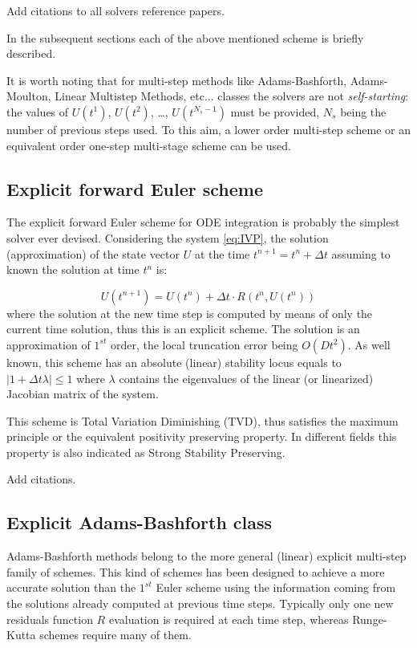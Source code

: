 {\color{red} Add citations to all solvers reference papers.}

In the subsequent sections each of the above mentioned scheme is briefly described.

It is worth noting that for multi-step methods like Adams-Bashforth, Adams-Moulton, Linear Multistep Methods, etc... classes the solvers are not \emph{self-starting}: the values of $U\left(t^{1}\right)$, $U\left(t^{2}\right)$, \dots, $U\left(t^{N_s-1}\right)$ must be provided, $N_s$ being the number of previous steps used. To this aim, a lower order multi-step scheme or an equivalent order one-step multi-stage scheme can be used.

\subsection{Explicit forward Euler scheme}

The explicit forward Euler scheme for ODE integration is probably the simplest solver ever devised. Considering the system \ref{eq:IVP}, the solution (approximation) of the state vector $U$ at the time $t^{n+1}=t^n+\Delta t$ assuming to known the solution at time $t^n$ is:

\begin{equation}
  U\left(t^{n+1}\right) = U\left(t^n\right) +\Delta t \cdot R\left(t^n, U\left(t^n\right)\right)
\label{eq:solver-euler}
\end{equation}
where the solution at the new time step is computed by means of only the current time solution, thus this is an explicit scheme. The solution is an approximation of $1^{st}$ order, the local truncation error being $O(Dt^2)$. As well known, this scheme has an absolute (linear) stability locus equals to $|1+\Delta t \lambda|\le 1$ where $\lambda$ contains the eigenvalues of the linear (or linearized) Jacobian matrix of the system.

This scheme is Total Variation Diminishing (TVD), thus satisfies the maximum principle or the equivalent positivity preserving property. In different fields this property is also indicated as Strong Stability Preserving.

{\color{red} Add citations.}

\subsection{Explicit Adams-Bashforth class}

Adams-Bashforth methods belong to the more general (linear) explicit multi-step family of schemes. This kind of schemes has been designed to achieve a more accurate solution than the $1^{st}$ Euler scheme using the information coming from the solutions already computed at previous time steps. Typically only one new residuals function $R$ evaluation is required at each time step, whereas Runge-Kutta schemes require many of them.


